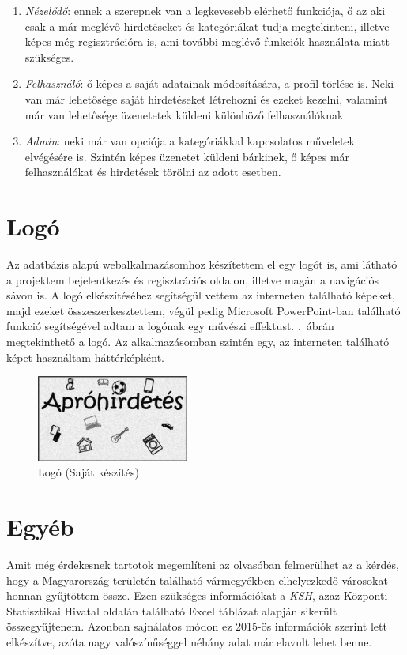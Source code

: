 \documentclass[]{thesis-ekf}
\theoremstyle{definition}
\theoremstyle{remark}
\begin{document}
	\begin{enumerate}
		\item \emph{Nézelődő}: ennek a szerepnek van a legkevesebb elérhető funkciója, ő az aki csak a már meglévő hirdetéseket és kategóriákat tudja megtekinteni, illetve képes még regisztrációra is, ami további meglévő funkciók használata miatt szükséges.
		\item \emph{Felhasználó}: ő képes a saját adatainak módosítására, a profil törlése is. Neki van már lehetősége saját hirdetéseket létrehozni és ezeket kezelni, valamint már van lehetősége üzenetetek küldeni különböző felhasználóknak.
		\item \emph{Admin}: neki már van opciója a kategóriákkal kapcsolatos műveletek elvégésére is. Szintén képes üzenetet küldeni bárkinek, ő képes már felhasználókat és hirdetések törölni az adott esetben.
	\end{enumerate}
	\section{Logó}
		Az adatbázis alapú webalkalmazásomhoz készítettem el egy logót is, ami látható a projektem bejelentkezés és regisztrációs oldalon, illetve magán a navigációs sávon is. A logó elkészítéséhez segítségül vettem az interneten található képeket, majd ezeket összeszerkesztettem, végül pedig Microsoft PowerPoint-ban található funkció segítségével adtam a logónak egy művészi effektust. .~ábrán megtekinthető a logó. Az alkalmazásomban szintén egy, az interneten található képet használtam háttérképként. \cite{Hatterkep, Logo}
		\begin{figure}[ht!]
			\centering
			\includegraphics[width=5cm]{./tervezes/logo}
			\caption{Logó (Saját készítés)} 
			\label{logo}
		\end{figure}
	
	\section{Egyéb}
		Amit még érdekesnek tartotok megemlíteni az olvasóban felmerülhet az a kérdés, hogy a Magyarország területén található vármegyékben elhelyezkedő városokat honnan gyűjtöttem össze. Ezen szükséges információkat a \emph{KSH}, azaz Központi Statisztikai Hivatal oldalán található Excel táblázat alapján sikerült összegyűjtenem. Azonban sajnálatos módon ez 2015-ös információk szerint lett elkészítve, azóta nagy valószínűséggel néhány adat már elavult lehet benne. \cite{KSH}
\end{document}
